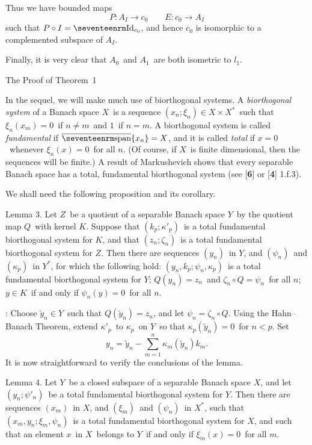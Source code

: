 Thus we have bounded maps
$$ P:A_I \to c_0 \qquad E:c_0 \to A_I $$
such that $P \circ I = \Id_{c_0}$, and hence $c_0$ is isomorphic to a
complemented subspace of $A_I$.

Finally, it is very
clear that $A_0$\ and $A_1$\ are both isometric to $l_1$.
\endproof

\beginsection The Proof of Theorem~1

In the sequel, we will make much use of
biorthogonal systems. A {\it biorthogonal system\/} of a Banach space $X$\ is a
sequence $(x_n;\xi_n) \in X\times X^*$\ such that $\xi_n(x_m) = 0$\ if $n\ne m$\
and $1$\ if $n=m$. A biorthogonal system is called {\it
fundamental\/} if $\span{x_n} = X$, and it is called {\it total\/} if $x=0$\
whenever $\xi_n(x) = 0$\ for all $n$. (Of course, if $X$\ is finite
dimensional, then the sequences will be finite.) A result of
Markushevich shows that every separable Banach space has a total, fundamental
biorthogonal system (see [{\bf 6}] or [{\bf 4}] 1.f.3).

We shall need the following proposition and its corollary.

\proclaim Lemma 3. Let $Z$\ be a quotient of a separable
Banach space $Y$\ by the quotient map $Q$\ with 
kernel $K$. Suppose that $(k_p;\kappa'_p)$\ is a total fundamental
biorthogonal system for $K$, and that $(z_n;\zeta_n)$\ is a total fundamental
biorthogonal system for $Z$. Then there are sequences $(y_n)$\ in $Y$, and
$(\psi_n)$\ and $(\kappa_p)$\ in $Y^*$, for which the following hold:
\itemi $(y_n,k_p;\psi_n,\kappa_p)$\ is a total fundamental biorthogonal system
for $Y$;
\itemii $Q(y_n) = z_n$\ and $\zeta_n\circ Q=\psi_n$\ for all $n$;
\itemiii $y\in K$\ if and only if $\psi_n(y) = 0$\ for all $n$.

\Proof: Choose $\tilde y_n \in Y$\ such that $Q(\tilde y_n)
= z_n$, and let $\psi_n = \zeta_n\circ Q$. Using the Hahn--Banach Theorem,
extend $\kappa'_p$\ to $\kappa_p$\ on $Y$\ so that $\kappa_p(\tilde y_n) = 0$\
for $n<p$. Set 
$$ y_n = \tilde y_n - \sum_{m=1}^n \kappa_m(\tilde y_n) k_m . $$
It is now straightforward to verify the conclusions of the lemma.
\endproof

\proclaim Lemma 4. Let $Y$\ be a closed subspace of a separable Banach space
$X$, and let $(y_n;\psi'_n)$\ be a total fundamental biorthogonal system for
$Y$. Then there are sequences $(x_m)$\ in $X$, and $(\xi_m)$\ and $(\psi_n)$\
in $X^*$, such that $(x_m,y_n;\xi_m,\psi_n)$\ is a total fundamental biorthogonal
system for $X$, and such that an element $x$\ in $X$\ belongs to $Y$\ if and
only if $\xi_m(x) = 0$\ for all $m$.

